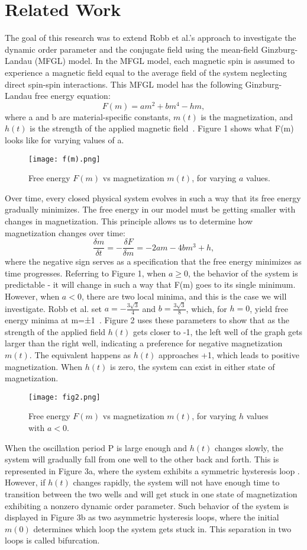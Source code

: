 \documentclass{article}
\begin{document}
\section{Related Work}
The goal of this research was
to extend Robb et al.’s approach to investigate the dynamic order parameter and the conjugate field using the mean-field Ginzburg-Landau (MFGL) model. In the MFGL model, each magnetic spin is assumed to experience a magnetic field equal to the average field of the system neglecting direct spin-spin interactions. This MFGL model has the following Ginzburg-Landau free energy equation:
\[F(m)=am^2+bm^4-hm,\]
where a and b are material-specific constants, $m(t)$ is the magnetization, and $h(t)$ is the strength of the applied magnetic field~\cite{2014}. Figure 1 shows what F(m) looks like for varying values of a.
\begin{figure}[h]
    \centering
    \texttt{[image: f(m).png]}
    \caption{Free energy $F(m)$ vs magnetization $m(t)$, for varying $a$ values.}
    \label{sklabel}
\end{figure}
Over time, every closed physical system evolves in such a way that its free energy gradually minimizes. The free energy in our model must be getting smaller with changes in magnetization. This principle allows us to determine how magnetization changes over time:
\[\frac{\delta m}{\delta t}=-\frac{\delta F}{\delta m}=-2am-4bm^3+h,\]
where the negative sign serves as a specification that the free energy minimizes as time progresses. Referring to Figure 1, when $a\geq 0$, the behavior of the system is predictable - it will change in such a way that F(m) goes to its single minimum. However, when $a<0$, there are two local minima, and this is the case we will investigate.
Robb et al. set $a=-\frac{3\sqrt{3}}{4}$ and $b=\frac{3\sqrt{3}}{8}$, which, for $h=0$, yield free energy minima at m=±1~\cite{2014}. Figure 2 uses these parameters to show that as the strength of the applied field $h(t)$ gets closer to -1, the left well of the graph gets larger than the right well, indicating a preference for negative magnetization $m(t)$. The equivalent happens as $h(t)$ approaches +1, which leads to positive magnetization. When $h(t)$ is zero, the system can exist in either state of magnetization. 
\begin{figure}[h]
    \centering
    \texttt{[image: fig2.png]}
    \caption{Free energy $F(m)$ vs magnetization $m(t)$, for varying $h$ values with $a<0$.}
    \label{sklabel}
\end{figure}
When the oscillation period P is large enough and $h(t)$ changes slowly, the system will gradually fall from one well to the other back and forth. This is represented in Figure 3a, where the system exhibits a symmetric hysteresis loop . However, if $h(t)$ changes rapidly, the system will not have enough time to transition between the two wells and will get stuck in one state of magnetization exhibiting a nonzero dynamic order parameter. Such behavior of the system is displayed in Figure 3b as two asymmetric hysteresis loops, where the initial $m(0)$ determines which loop the system gets stuck in. This separation in two loops is called bifurcation.
\end{document}
